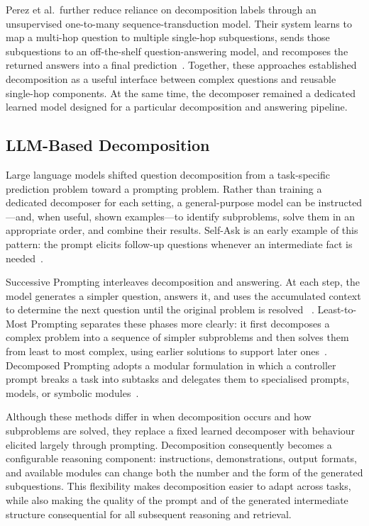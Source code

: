 Perez et al.\ further reduce reliance on decomposition labels through an
unsupervised one-to-many sequence-transduction model. Their system learns to
map a multi-hop question to multiple single-hop subquestions, sends those
subquestions to an off-the-shelf question-answering model, and recomposes the
returned answers into a final prediction~\cite{perez2020unsupervised}. Together,
these approaches established decomposition as a useful interface between
complex questions and reusable single-hop components. At the same time, the
decomposer remained a dedicated learned model designed for a particular
decomposition and answering pipeline.

\subsection{LLM-Based Decomposition}
\label{subsec:llm-based-decomposition}

Large language models shifted question decomposition from a task-specific
prediction problem toward a prompting problem. Rather than training a dedicated
decomposer for each setting, a general-purpose model can be instructed---and,
when useful, shown examples---to identify subproblems, solve them in an
appropriate order, and combine their results. Self-Ask is an early example of
this pattern: the prompt elicits follow-up questions whenever an intermediate
fact is needed~\cite{press2023compositionality}.

Successive Prompting interleaves decomposition and answering. At each step, the
model generates a simpler question, answers it, and uses the accumulated
context to determine the next question until the original problem is resolved
~\cite{dua2022successive}. Least-to-Most Prompting separates these phases more
clearly: it first decomposes a complex problem into a sequence of simpler
subproblems and then solves them from least to most complex, using earlier
solutions to support later ones~\cite{zhou2023leasttomost}. Decomposed Prompting
adopts a modular formulation in which a controller prompt breaks a task into
subtasks and delegates them to specialised prompts, models, or symbolic
modules~\cite{khot2023decomposed}.

Although these methods differ in when decomposition occurs and how subproblems
are solved, they replace a fixed learned decomposer with behaviour elicited
largely through prompting. Decomposition consequently becomes a configurable
reasoning component: instructions, demonstrations, output formats, and
available modules can change both the number and the form of the generated
subquestions. This flexibility makes decomposition easier to adapt across
tasks, while also making the quality of the prompt and of the generated
intermediate structure consequential for all subsequent reasoning and
retrieval.

